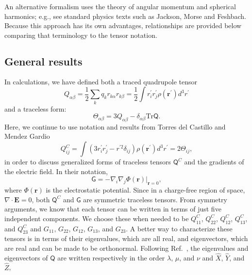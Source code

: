An alternative formalism uses the theory of angular momentum and spherical harmonics;  e.g., see standard physics texts such as Jackson, Morse and Feshbach. Because this approach has its own advantages, relationships are provided below comparing that terminology to the tensor notation.

\subsection{General results}

In calculations, we have defined both a traced quadrupole tensor
\begin{equation*}
Q_{\alpha \beta} = \frac{1}{2} \sum_k q_k r_{k \alpha} r_{k \beta} = 
\frac{1}{2} \int r^{\prime}_i r^{\prime}_j  \rho(\mathbf{r}^{\prime}) d^3 r^{\prime} 
\end{equation*}
and a traceless form:
\begin{equation*}
\Theta_{\alpha \beta}=3Q_{\alpha \beta} - \delta_{\alpha \beta}\textrm{Tr} \mathsf{Q} .
\end{equation*} 
Here, we continue to use notation and results from Torres del Castillo and Mendez Gardio \cite{Torres-del-Castillo:2006uo}
\begin{equation*}
Q^C_{ij}=\int(3r^{\prime}_i r^{\prime}_j - r^{{\prime}2}\delta_{ij}) \rho(\mathbf{r}^{\prime}) d^3 r^{\prime}=2\Theta_{ij}  ,
\end{equation*}
in order to discuss generalized forms of traceless tensors $\mathsf{Q}^C$ 
and the gradients of the electric field.
In their notation, 
\begin{equation*}
\mathsf{G}=-\nabla _i \nabla_j \Phi(\mathbf{r})|_{\mathbf{r}=0}  ,
\end{equation*}
where $\Phi(\mathbf{r})$ is the electrostatic potential.  
Since in a charge-free region of space, $\nabla \cdot \mathbf{E}=0$, both
$\mathsf{Q}^C$  and $\mathsf{G}$  are symmetric traceless tensors.  From symmetry
arguments, we know that each tensor can be written in terms of just five independent components.
We choose these when needed to be  $Q^C_{11}$, $Q^C_{22}$, $Q^C_{12}$, $Q^C_{13}$, and $Q^C_{23}$ and
$G_{11}$, $G_{22}$, $G_{12}$, $G_{13}$, and $G_{23}$.
A better way to characterize these tensors is in terms of their eigenvalues, which are all real, 
and eigenvectors, which  are real and can be made to be orthonormal.  Following Ref.~\cite{Torres-del-Castillo:2006uo}, the eigenvalues and eigenvectors of 
$\mathsf{Q}$  are written respectively in the order $\lambda$, $\mu$, and $\nu$ and $\hat{X}$, $\hat{Y}$, and $\hat{Z}$,
